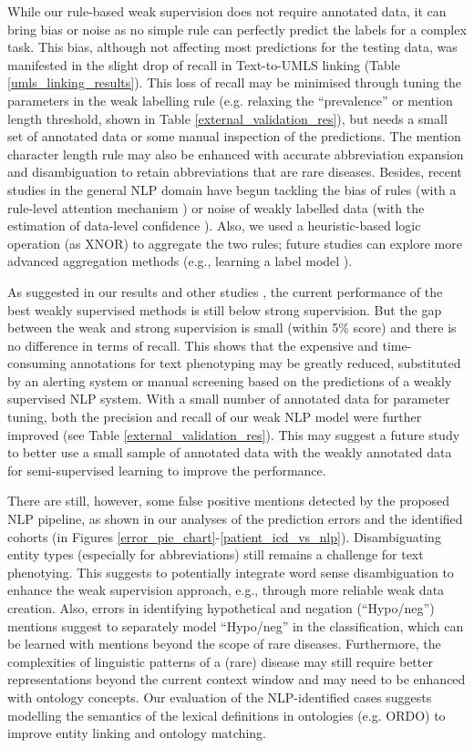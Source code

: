 \documentclass[twocolumn]{bmcart}
\begin{document}
While our rule-based weak supervision does not require annotated data, it can bring bias or noise as no simple rule can perfectly predict the labels for a complex task. This bias, although not affecting most predictions for the testing data, was manifested in the slight drop of recall in Text-to-UMLS linking (Table \ref{umls_linking_results}). This loss of recall may be minimised through tuning the parameters in the weak labelling rule (e.g. relaxing the ``prevalence'' or mention length threshold, shown in Table \ref{external_validation_res}), but needs a small set of annotated data or some manual inspection of the predictions. The mention character length rule may also be enhanced with accurate abbreviation expansion and disambiguation to retain abbreviations that are rare diseases. Besides, recent studies in the general NLP domain have begun tackling the bias of rules (with a rule-level attention mechanism \cite{karamanolakis2021}) or noise of weakly labelled data (with the estimation of data-level confidence \cite{jiang2021}). Also, we used a heuristic-based logic operation (as XNOR) to aggregate the two rules; future studies can explore more advanced aggregation methods (e.g., learning a label model \cite{fries2021ontology,ratner2020snorkel}).

As suggested in our results and other studies \cite{fries2021ontology,ratner2020snorkel}, the current performance of the best weakly supervised methods is still below strong supervision. But the gap between the weak and strong supervision is small (within 5\%  score) and there is no difference in terms of recall. This shows that the expensive and time-consuming annotations for text phenotyping may be greatly reduced, substituted by an alerting system or manual screening based on the predictions of a weakly supervised NLP system. With a small number of annotated data for parameter tuning, both the precision and recall of our weak NLP model were further improved (see Table \ref{external_validation_res}). This may suggest a future study to better use a small sample of annotated data with the weakly annotated data for semi-supervised learning to improve the performance.

There are still, however, some false positive mentions detected by the proposed NLP pipeline, as shown in our analyses of the prediction errors and the identified cohorts (in Figures \ref{error_pie_chart}-\ref{patient_icd_vs_nlp}). Disambiguating entity types (especially for abbreviations) still remains a challenge for text phenotying. This suggests to potentially integrate word sense disambiguation to enhance the weak supervision approach, e.g., through more reliable weak data creation. Also, errors in identifying hypothetical and negation (``Hypo/neg'') mentions suggest to separately model ``Hypo/neg'' in the classification, which can be learned with mentions beyond the scope of rare diseases. Furthermore, the complexities of linguistic patterns of a (rare) disease may still require better representations beyond the current context window and may need to be enhanced with ontology concepts. Our evaluation of the NLP-identified cases suggests modelling the semantics of the lexical definitions in ontologies (e.g. ORDO) to improve entity linking and ontology matching.
\end{document}
